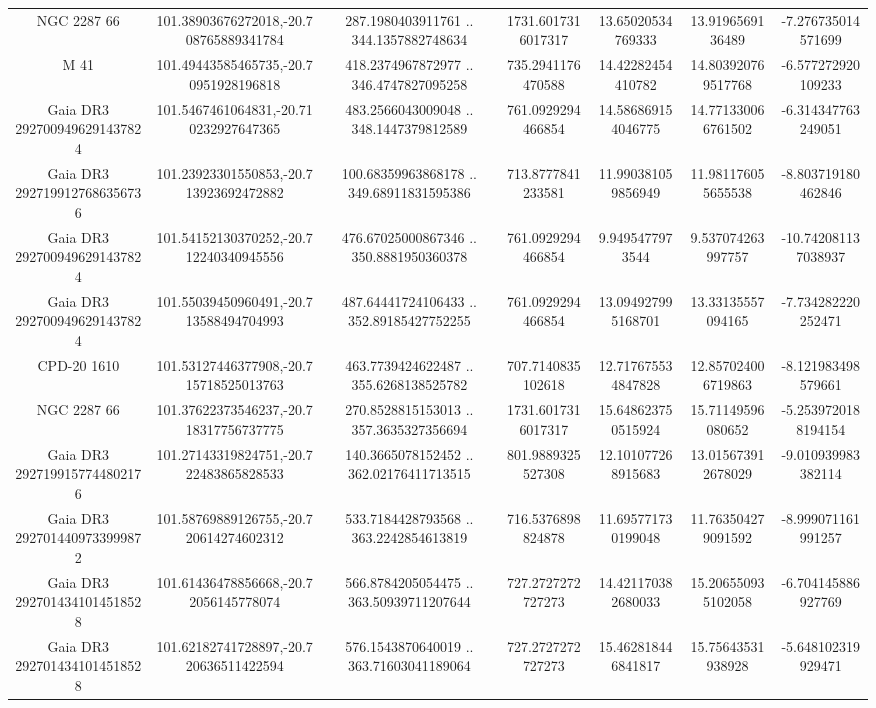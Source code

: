 \begin{table}
\begin{tabular}{ccccccc}
NGC  2287    66 & 101.38903676272018,-20.708765889341784 & 287.1980403911761 .. 344.1357882748634 & 1731.6017316017317 & 13.65020534769333 & 13.9196569136489 & -7.276735014571699 \\
M  41 & 101.49443585465735,-20.70951928196818 & 418.2374967872977 .. 346.4747827095258 & 735.2941176470588 & 14.42282454410782 & 14.803920769517768 & -6.577272920109233 \\
Gaia DR3 2927009496291437824 & 101.5467461064831,-20.710232927647365 & 483.2566043009048 .. 348.1447379812589 & 761.0929294466854 & 14.586869154046775 & 14.771330066761502 & -6.314347763249051 \\
Gaia DR3 2927199127686356736 & 101.23923301550853,-20.713923692472882 & 100.68359963868178 .. 349.68911831595386 & 713.8777841233581 & 11.990381059856949 & 11.981176055655538 & -8.803719180462846 \\
Gaia DR3 2927009496291437824 & 101.54152130370252,-20.712240340945556 & 476.67025000867346 .. 350.8881950360378 & 761.0929294466854 & 9.9495477973544 & 9.537074263997757 & -10.742081137038937 \\
Gaia DR3 2927009496291437824 & 101.55039450960491,-20.713588494704993 & 487.64441724106433 .. 352.89185427752255 & 761.0929294466854 & 13.094927995168701 & 13.33135557094165 & -7.734282220252471 \\
CPD-20  1610 & 101.53127446377908,-20.715718525013763 & 463.7739424622487 .. 355.6268138525782 & 707.7140835102618 & 12.717675534847828 & 12.857024006719863 & -8.121983498579661 \\
NGC  2287    66 & 101.37622373546237,-20.718317756737775 & 270.8528815153013 .. 357.3635327356694 & 1731.6017316017317 & 15.648623750515924 & 15.71149596080652 & -5.2539720188194154 \\
Gaia DR3 2927199157744802176 & 101.27143319824751,-20.722483865828533 & 140.3665078152452 .. 362.02176411713515 & 801.9889325527308 & 12.101077268915683 & 13.015673912678029 & -9.010939983382114 \\
Gaia DR3 2927014409733999872 & 101.58769889126755,-20.720614274602312 & 533.7184428793568 .. 363.2242854613819 & 716.5376898824878 & 11.695771730199048 & 11.763504279091592 & -8.999071161991257 \\
Gaia DR3 2927014341014518528 & 101.61436478856668,-20.72056145778074 & 566.8784205054475 .. 363.50939711207644 & 727.2727272727273 & 14.421170382680033 & 15.206550935102058 & -6.704145886927769 \\
Gaia DR3 2927014341014518528 & 101.62182741728897,-20.720636511422594 & 576.1543870640019 .. 363.71603041189064 & 727.2727272727273 & 15.462818446841817 & 15.75643531938928 & -5.648102319929471 \\

\end{tabular}
\end{table}
